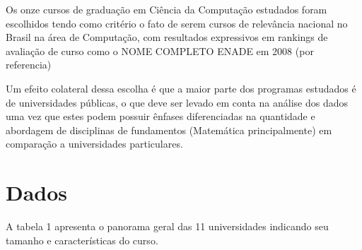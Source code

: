 \documentclass[conference]{IEEEtran}
\begin{document}
	Os onze cursos de graduação em Ciência da Computação estudados foram escolhidos tendo como critério o fato de serem cursos de relevância nacional no Brasil na área de Computação, com resultados expressivos em rankings de avaliação de curso como o NOME COMPLETO ENADE em 2008 (por referencia)

	Um efeito colateral dessa escolha é que a maior parte dos programas estudados é de universidades públicas, o que deve ser levado em conta na análise dos dados uma vez que estes podem possuir ênfases diferenciadas na quantidade e abordagem de disciplinas de fundamentos (Matemática principalmente) em comparação a universidades particulares.

\section{Dados}
A tabela 1 apresenta o panorama geral das 11 universidades indicando seu tamanho e características do curso.
\end{document}
